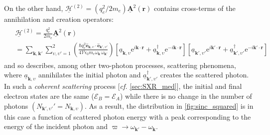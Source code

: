 On the other hand, $\underline{\mathcal{H}}^{(2)} = \left( q_e^2 / 2 m_e \right) \underline{\mathbold{A}}^2 \left( \mathbold{r} \right)$ contains cross-terms of the annihilation and creation operators: 
\begin{align}\label{eq:two_photon_Hamiltonian}
 \begin{split}
 &\underline{\mathcal{H}}^{(2)} = \frac{q_e^2}{2 m_e} \underline{\mathbold{A}}^2 \left( \mathbold{r} \right) \\
 &= \sum_{\mathbold{k},\mathbold{k}'} \sum_{\upsilon,\upsilon' = 1}^2 \left( \frac{\hbar q_e^2 \hat{\mathbold{e}}_{\mathbold{k},\upsilon} \cdot \hat{\mathbold{e}}_{\mathbold{k}',\upsilon'} }{4 \mathcal{V} \epsilon_0 m_e \omega_{\mathbold{k}} \, \omega_{\mathbold{k}'}} \right) \left[ \underline{a}_{\mathbold{k},\upsilon} \mathrm{e}^{i \mathbold{k} \cdot \mathbold{r} } + \underline{a}^{\dagger}_{\mathbold{k},\upsilon} \mathrm{e}^{-i \mathbold{k} \cdot \mathbold{r} } \right] \left[ \underline{a}_{\mathbold{k}',\upsilon'} \mathrm{e}^{i \mathbold{k}' \cdot \mathbold{r} } + \underline{a}^{\dagger}_{\mathbold{k}',\upsilon'} \mathrm{e}^{-i \mathbold{k}' \cdot \mathbold{r} } \right] 
 \end{split}
 \end{align} 
and so describes, among other two-photon processes, scattering phenomena, where $\underline{a}_{\mathbold{k},\upsilon}$ annihilates the initial photon and $\underline{a}^{\dagger}_{\mathbold{k}',\upsilon'}$ creates the scattered photon. 
In such a \emph{coherent scattering} process [\emph{cf.\@} \cref{sec:SXR_med}], the initial and final electron states are the same ($\mathcal{E}_B = \mathcal{E}_A$) while there is no change in the number of photons $\left( N_{\mathbold{k}',\upsilon'}' = N_{\mathbold{k},\upsilon} \right)$. 
As a result, the distribution in \cref{fig:sinc_squared} is in this case a function of scattered photon energy with a peak corresponding to the energy of the incident photon and $\varpi \to \omega_{\mathbold{k}'} - \omega_{\mathbold{k}}$.  


